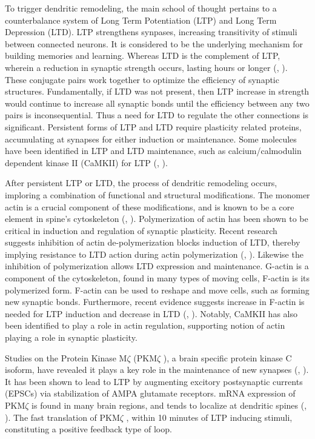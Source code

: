 \documentclass[12pt, a4paper]{article}
\newcommand{\PK}{PKM$\zeta$ }
\newcommand{\citeapa}[1]{(\citeauthor{#1}, \citeyear{#1})}
\begin{document}
To trigger dendritic remodeling, the main school of thought pertains to a counterbalance system of Long Term Potentiation (LTP) and Long Term Depression (LTD). LTP strengthens synpases, increasing transitivity of stimuli between connected neurons. It is considered to be the underlying mechanism for building memories and learning. Whereas LTD is the complement of LTP, wherein a reduction in synaptic strength occurs, lasting hours or longer \citeapa{LTDPaper}. These conjugate pairs work together to optimize the efficiency of synaptic structures. Fundamentally, if LTD was not present, then LTP increase in strength would continue to increase all synaptic bonds until the efficiency between any two pairs is inconsequential. Thus a need for LTD to regulate the other connections is significant. Persistent forms of LTP and LTD require plasticity related proteins, accumulating at synapses for either induction or maintenance. Some molecules have been identified in LTP and LTD maintenance, such as calcium/calmodulin dependent kinase II (CaMKII) for LTP \citeapa{actinDynamics}. 

After persistent LTP or LTD, the process of dendritic remodeling occurs, imploring a combination of functional and structural modifications. The monomer actin is a crucial component of these modifications, and is known to be a core element in spine's cytoskeleton \citeapa{actin_spine}. Polymerization of actin has been shown to be critical in induction and regulation of synaptic plasticity. Recent research suggests inhibition of actin de-polymerization blocks induction of LTD, thereby implying resistance to LTD action during actin polymerization \citeapa{actinDynamics}. Likewise the inhibition of polymerization allows LTD expression and maintenance. G-actin is a component of the cytoskeleton, found in many types of moving cells, F-actin is its polymerized form. F-actin can be used to reshape and move cells, such as forming new synaptic bonds. Furthermore, recent evidence suggests increase in F-actin is needed for LTP induction and decrease in LTD \citeapa{actinDynamics}. Notably, CaMKII has also been identified to play a role in actin regulation, supporting notion of actin playing a role in synaptic plasticity. 

Studies on the Protein Kinase M$\zeta$ (\PK), a brain specific protein kinase C isoform, have revealed it plays a key role in the maintenance of new synapses \citeapa{pkmZeta}. It has been shown to lead to LTP by augmenting excitory postsynaptic currents (EPSCs) via stabilization of AMPA glutamate receptors. mRNA expression of \PK is found in many brain regions, and tends to localize at dendritic spines \citeapa{pkmZeta}. The fast translation of \PK, within 10 minutes of LTP inducing stimuli, constituting a positive feedback type of loop. 
\end{document}
